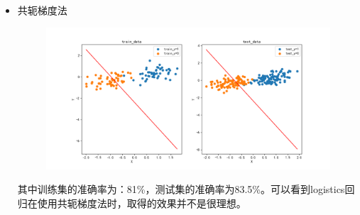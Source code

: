 \documentclass[lang=cn,a4paper,cite=authoryear]{elegantpaper}
\begin{document}
\begin{itemize}
	\par
	\item 共轭梯度法
	\begin{center}
		\begin{figure}[H]
			\centering
			\includegraphics[scale=0.5]{gctest02}
		\end{figure}
	\end{center}
	其中训练集的准确率为：81\%，测试集的准确率为83.5\%。可以看到logistics回归在使用共轭梯度法时，取得的效果并不是很理想。
\end{itemize}
\end{document}

